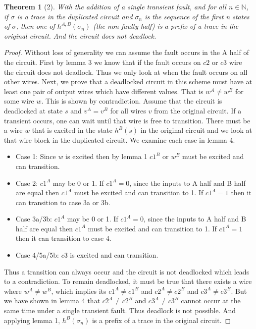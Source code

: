 \documentclass[12pt]{report}
\newtheorem*{theorem}{Theorem}
\begin{document}
\begin{theorem}[2]
With the addition of a single transient fault, and for all $n \in \mathbb{N}$, if $\sigma$ is a trace in the duplicated circuit and $\sigma_n$ is the sequence of the first n states of $\sigma$, then one of $h^{A,B}(\sigma_n)$ (the non faulty half) is a prefix of a trace in the original circuit.  And the circuit does not deadlock.  
\end{theorem}
\begin{proof}
Without loss of generality we can assume the fault occurs in the A half of the circuit.  First by lemma 3 we know that if the fault occurs on $c2$ or $c3$ wire the circuit does not deadlock.  Thus we only look at when the fault occurs on all other wires. 
Next, we prove that a deadlocked circuit in this scheme must have at least one pair of output wires which have different values.  That is $w^A\neq w^B$ for some wire $w$.
This is shown by contradiction.  Assume that the circuit is deadlocked at state $s$ and $v^A = v^B$ for all wires $v$ from the original circuit.  If a transient occurs, one can wait until that wire is free to transition.  There
 must be a wire $w$ that is excited in the state $h^B(s)$ in the original circuit and we look at that wire block in the duplicated circuit.  We examine each case in lemma 4.
\begin{itemize}
	\item
	Case 1: Since $w$ is excited then by lemma 1 $c1^B$ or $w^B$ must be excited and can transition.
\item
Case 2:  $c1^A$ may be 0 or 1.  If $c1^A=0$, since the inputs to A half and B half are equal then $c1^A$ must be excited and can transition to 1.  If $c1^A=1$ then it can transition to case 3a or 3b.
\item
Case 3a/3b:  $c1^A$ may be 0 or 1.  If $c1^A=0$, since the inputs to A half and B half are equal then $c1^A$ must be excited and can transition to 1.  If $c1^A=1$ then it can transition to case 4.
\item
Case 4/5a/5b:  $c3$ is excited and can transition.
\end{itemize}
Thus a transition can always occur and the circuit is not deadlocked which leads to a contradiction.  To remain deadlocked, it must be true that there exists a wire where $w^A\neq w^B$, which implies its $c1^A\neq c1^B$ and $c2^A\neq c2^B$ and $c3^A\neq c3^B$.  But we have shown in lemma 4 that $c2^A\neq c2^B$ and $c3^A\neq c3^B$ cannot occur at the same time under a single transient fault. Thus deadlock is not possible.  And applying lemma 1, $h^B(\sigma_n)$ is a prefix of a trace in the original circuit. 
\end{proof}



%


\end{document}
